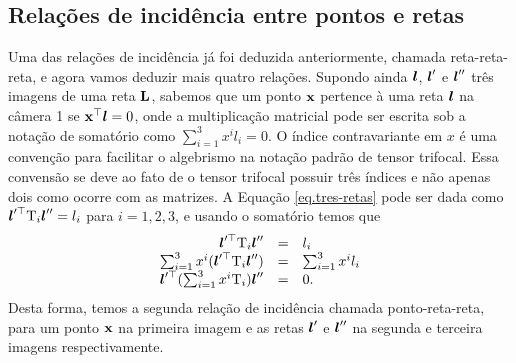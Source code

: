 \subsection{Relações de incidência entre pontos e retas}\label{sec.rela-incidi-tri}
Uma das relações de incidência já foi deduzida anteriormente, chamada reta-reta-reta, e agora vamos deduzir mais quatro relações. Supondo ainda $\boldsymbol{l}$, $\boldsymbol{l}'$ e $\boldsymbol{l}''$ três imagens de uma reta ${\bf L}$, sabemos que um ponto $\mathbf{x}$ pertence à uma reta $\boldsymbol{l}$ na câmera 1 se $\mathbf{x}^\top\boldsymbol{l}=0$, onde a multiplicação matricial pode ser escrita sob a notação de somatório como $\sum_{i=1}^{3}x^il_i=0$. O índice contravariante em $x$ é uma convenção para facilitar o algebrismo na notação padrão de tensor trifocal. Essa convensão se deve ao fato de o tensor trifocal possuir três índices e não apenas dois como ocorre com as matrizes. A Equação \ref{eq.tres-retas} pode ser dada como $\boldsymbol{l}'^\top \mbox{T}_i\boldsymbol{l}''
=l_i$ para $i=1,2,3$, e usando o somatório temos que
\begin{equation*}
\begin{array}{rcl}
\boldsymbol{l}'^\top \mbox{T}_i\boldsymbol{l}''
&=&l_i\\
\sum_{i=1}^3 x^i(\boldsymbol{l}'^\top \mbox{T}_i\boldsymbol{l}'')&=&\sum_{i=1}^3 x^il_i\\
\boldsymbol{l}'^\top(\sum_{i=1}^3 x^i\mbox{T}_i)\boldsymbol{l}''&=&0.
\end{array}
\end{equation*}
Desta forma, temos a segunda relação de incidência chamada ponto-reta-reta, para um ponto $\mathbf{x}$ na primeira imagem e as retas $\boldsymbol{l}'$ e $\boldsymbol{l}''$ na segunda e terceira imagens respectivamente. 

